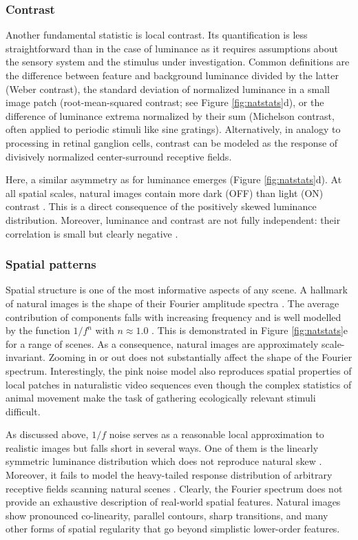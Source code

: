 \subsubsection{Contrast}
Another fundamental statistic is local contrast. Its quantification is less straightforward than in the case of luminance as it requires assumptions about the sensory system and the stimulus under investigation. Common definitions are the difference between feature and background luminance divided by the latter (Weber contrast), the standard deviation of normalized luminance in a small image patch (root-mean-squared contrast; see Figure \ref{fig:natstats}d), or the difference of luminance extrema normalized by their sum (Michelson contrast, often applied to periodic stimuli like sine gratings). Alternatively, in analogy to processing in retinal ganglion cells, contrast can be modeled as the response of divisively normalized center-surround receptive fields.

Here, a similar asymmetry as for luminance emerges (Figure \ref{fig:natstats}d). At all spatial scales, natural images contain more dark (OFF) than light (ON) contrast \citep{Ratliff:2010kb,Cooper:2015in}. This is a direct consequence of the positively skewed luminance distribution. Moreover, luminance and contrast are not fully independent: their correlation is small but clearly negative \citep{Geisler:2008gu}.

\subsubsection{Spatial patterns}
Spatial structure is one of the most informative aspects of any scene. A hallmark of natural images is the shape of their Fourier amplitude spectra \citep{Geisler:2008gu}. The average contribution of components falls with increasing frequency and is well modelled by the function $1/f^n$ with $n\approx1.0$ \citep{Field:1987ua,Ruderman:1994ty,Dyakova:2015dy}. This is demonstrated in Figure \ref{fig:natstats}e for a range of scenes. As a consequence, natural images are approximately scale-invariant. Zooming in or out does not substantially affect the shape of the Fourier spectrum. Interestingly, the pink noise model also reproduces spatial properties of local patches in naturalistic video sequences \citep{Dong:1995aa} even though the complex statistics of animal movement make the task of gathering ecologically relevant stimuli difficult.

As discussed above, $1/f$ noise serves as a reasonable local approximation to realistic images but falls short in several ways. One of them is the linearly symmetric luminance distribution which does not reproduce natural skew \citep{Geisler:2008gu}. Moreover, it fails to model the heavy-tailed response distribution of arbitrary receptive fields scanning natural scenes \citep{Field:1987ua}. Clearly, the Fourier spectrum does not provide an exhaustive description of real-world spatial features. Natural images show pronounced co-linearity, parallel contours, sharp transitions, and many other forms of spatial regularity that go beyond simplistic lower-order features.

